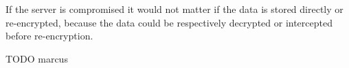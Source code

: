 If the server is compromised it would not matter if the data is stored
directly or re-encrypted, because the data could be respectively
decrypted or intercepted before re-encryption.





TODO marcus

